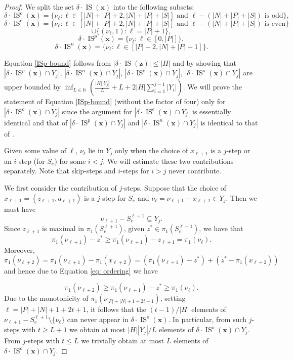 \documentclass[11pt]{amsart}
\theoremstyle{definition}
\newcommand{\bx}{\mathbf{x}}
\DeclareMathOperator{\IS}{IS}
\begin{document}
\begin{proof}
We split the set $\delta\cdot\IS(\bx)$ into the following subsets:
 $$\delta\cdot\IS^o(\bx)=\{\nu_\ell :\ell \in [ |N|+|P|+2 ,|N|+|P|+|S|] \mbox{ and }\ell-(|N|+|P|+|S|) \mbox{ is odd}\},$$
 $$\delta\cdot\IS^e(\bx)=\{\nu_\ell :\ell \in [ |N|+|P|+2 ,|N|+|P|+|S|] \mbox{ and }\ell-(|N|+|P|+|S|) \mbox{ is even}\}$$
$$\cup \{(\nu_\ell,1): \ell=|P|+1\},$$
 $$\delta\cdot\IS^p(\bx)=\{\nu_\ell :\ell \in [0 ,|P|]\},$$
 $$\delta\cdot\IS^n(\bx)=\{\nu_\ell:\ell \in [ |P|+2 ,|N|+|P|+1] \}.$$


Equation \eqref{ISp-bound} follows from $|\delta \cdot \IS(\mathbf{z})| \leq |H|$ and by showing that $|\delta\cdot\IS^{p}(\bx) \cap Y_j|$, $|\delta\cdot\IS^{n}(\bx) \cap Y_j|$, $|\delta\cdot\IS^{e}(\bx) \cap Y_j|$, $|\delta\cdot\IS^{o}(\bx) \cap Y_j|$ are upper bounded by $\inf_{L \in \mathbb{N}} \left(\frac{|H| |Y_j|}{L}+L+2|H|\sum_{i=1}^{j-1}|Y_i|\right)$. 
We will prove the statement of Equation \eqref{ISp-bound} (without the factor of four) only for $|\delta\cdot\IS^{o}(\bx) \cap Y_j|$ since the argument for $|\delta\cdot\IS^e(\bx) \cap Y_j|$ is essentially identical and that of $|\delta\cdot\IS^p(\bx) \cap Y_j|$ and $|\delta\cdot\IS^n(\bx) \cap Y_j|$ is identical to that of \cite{BK}.

Given some value of $\ell$, $\nu_\ell$ lie in $Y_j$ only when the choice of $x_{\ell+1}$ is a $j$-step or an $i$-step (for $S_e$) for some $i<j$.  We will estimate these two contributions separately.  Note that skip-steps and $i$-steps for $i>j$ never contribute.

We first consider the contribution of $j$-steps. Suppose that the choice of $x_{\ell+1}=(z_{\ell+1},a_{\ell+1})$ is a $j$-step for $S_e$ and $\nu_\ell=\nu_{\ell+1}-x_{\ell+1} \in Y_j$.  Then we must have
$$\nu_{\ell+1} - S_e^{\ell+1} \subseteq Y_j.$$
Since $ z_{\ell+1}$ is maximal in $ \pi_1(S_e^{\ell+1})$, given $z^*\in \pi_1(S_e^{\ell+1})$, we have that
$$ \pi_1(\nu_{\ell+1})- z^*\geq \pi_1(\nu_{\ell+1})- z_{\ell+1}=\pi_1(\nu_{\ell}).$$
Moreover,$$\pi_1(\nu_{\ell+2})=\pi_1(\nu_{\ell+1})-\pi_1(x_{\ell+2})=(\pi_1(\nu_{\ell+1})- z^*)+(z^*-\pi_1(x_{\ell+2}))$$
and hence due to Equation \eqref{eq: ordering} we have

$$\pi_1(\nu_{\ell+2}) \geq \pi_1(\nu_{\ell+1}) - z^*\geq \pi_1(\nu_{\ell}).$$
Due to the monotonicity of $\pi_1(\nu_{|P|+|N|+1+2t+1})$, setting $\ell=|P|+|N|+1+2t+1$, it follows that the $(t-1)/|H|$ elements of $\nu_{\ell+1}- S_e^{\ell+1} \setminus \{\nu_\ell\}$ can never appear in $\delta\cdot\IS^o(\bx)$.  In particular, from such $j$-steps with $t \geq L+1$ we obtain at most $|H||Y_j|/L$ elements of $\delta\cdot\IS^o(\bx) \cap Y_j$. From $j$-steps with $t \leq L$ we trivially obtain at most $L$ elements of $\delta\cdot\IS^o(\bx) \cap Y_j$.


\end{proof}
\end{document}
